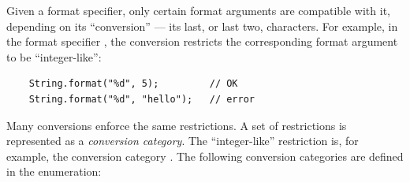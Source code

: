 Given a format specifier, only certain format arguments are compatible with
it, depending on its ``conversion'' --- its last, or last two,
characters.  For example, in the format specifier , the
conversion  restricts the corresponding format argument
to be ``integer-like'':

\begin{Verbatim}
    String.format("%d", 5);         // OK
    String.format("%d", "hello");   // error
\end{Verbatim}

\noindent Many conversions enforce the same restrictions.  A set of
restrictions is represented as a \emph{conversion
category}. The ``integer-like'' restriction is, for example, the conversion
category \@.  The following conversion categories are defined in the
 enumeration:

